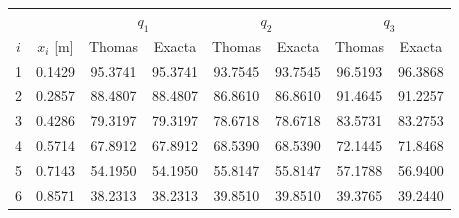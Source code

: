\begin{tabular}{c c cc cc cc}
\toprule
 & & \multicolumn{2}{c}{$q_1$} & \multicolumn{2}{c}{$q_2$} & \multicolumn{2}{c}{$q_3$}\\
$i$ & $x_i$ [m] & Thomas & Exacta & Thomas & Exacta & Thomas & Exacta\\
\midrule
1 & 0.1429 & 95.3741 & 95.3741 & 93.7545 & 93.7545 & 96.5193 & 96.3868\\
2 & 0.2857 & 88.4807 & 88.4807 & 86.8610 & 86.8610 & 91.4645 & 91.2257\\
3 & 0.4286 & 79.3197 & 79.3197 & 78.6718 & 78.6718 & 83.5731 & 83.2753\\
4 & 0.5714 & 67.8912 & 67.8912 & 68.5390 & 68.5390 & 72.1445 & 71.8468\\
5 & 0.7143 & 54.1950 & 54.1950 & 55.8147 & 55.8147 & 57.1788 & 56.9400\\
6 & 0.8571 & 38.2313 & 38.2313 & 39.8510 & 39.8510 & 39.3765 & 39.2440\\
\bottomrule
\end{tabular}
